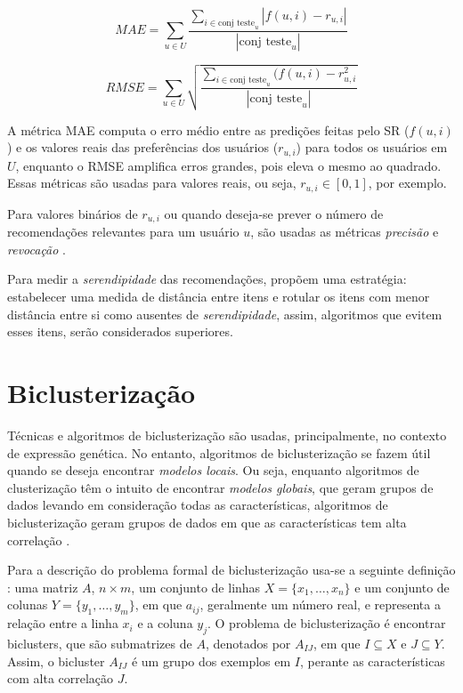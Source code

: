 \documentclass[normaltoc, espacoumemeio, pnumromarab,ruledheader]{abnt}
\begin{document}
\begin{equation}
\label{eq:mae}
MAE = \sum_{u \in U} \frac{\sum_{i \in \text{conj teste}_u} |f(u,i) - r_{u,i}|}{|\text{conj teste}_u|}
\end{equation}

\begin{equation}
\label{eq:rmse}
RMSE = \sum_{u \in U} \sqrt{\frac{\sum_{i \in \text{conj teste}_u} (f(u,i) - r_{u,i}^2}{|\text{conj teste}_u|}}
\end{equation}

A métrica MAE computa o erro médio entre as predições feitas pelo SR ($f(u,i)$) e os valores reais das preferências dos usuários ($r_{u,i}$) para todos os usuários em $U$, enquanto o RMSE amplifica erros grandes, pois eleva o mesmo ao quadrado. Essas métricas são usadas para valores reais, ou seja, $r_{u,i} \in [0,1]$, por exemplo.

Para valores binários de $r_{u,i}$ ou quando deseja-se prever o número de recomendações relevantes para um usuário $u$, são usadas as métricas \textit{precisão} e \textit{revocação} \cite{Jannach2011}.

Para medir a \textit{serendipidade} das recomendações,  propõem uma estratégia: estabelecer uma medida de distância entre itens e rotular os itens com menor distância entre si como ausentes de \textit{serendipidade}, assim, algoritmos que evitem esses itens, serão considerados superiores.

\section{Biclusterização}
\label{sec:bicl}

Técnicas e algoritmos de biclusterização são usadas, principalmente, no contexto de expressão genética.
No entanto, algoritmos de biclusterização se fazem útil quando se deseja encontrar \textit{modelos locais}.
Ou seja, enquanto algoritmos de clusterização têm o intuito de encontrar \textit{modelos globais}, que geram grupos de dados levando em consideração todas as características, algoritmos de biclusterização geram grupos de dados em que as características tem alta correlação \cite{Madeira2004}.

Para a descrição do problema formal de biclusterização usa-se a seguinte definição \cite{Madeira2004}: uma matriz $A$, $n \times m$, um conjunto de linhas $X = \{ x_1, \dots, x_n \}$ e um conjunto de colunas $Y = \{ y_1, \dots, y_m \}$, em que $a_{ij}$, geralmente um número real, e representa a relação entre a linha $x_i$ e a coluna $y_j$.
O problema de biclusterização é encontrar biclusters, que são submatrizes de $A$, denotados por $A_{IJ}$, em que $I \subseteq X$ e $J \subseteq Y$.
Assim, o bicluster $A_{IJ}$ é um grupo dos exemplos em $I$, perante as características com alta correlação $J$.
\end{document}
